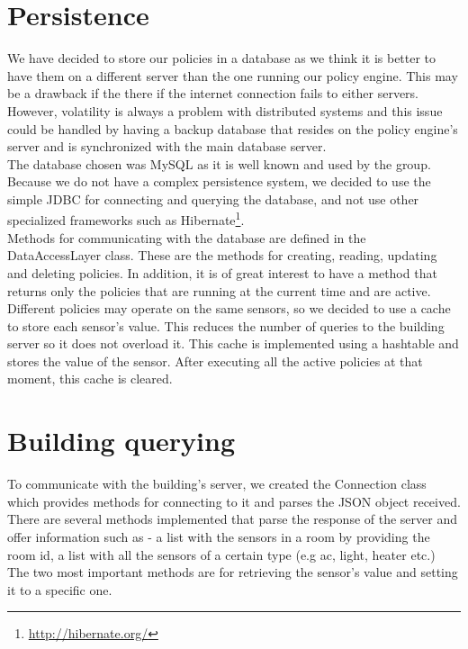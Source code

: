 \section{Persistence}
We have decided to store our policies in a database as we think it is better to have them on a different server than the one running our policy engine. This may be a drawback if the there if the internet connection fails to either servers. However, volatility is always a problem with distributed systems and this issue could be handled by having a backup database that resides on the policy engine's server and is synchronized with the main database server.
\\ The database chosen was MySQL as it is well known and used by the group. Because we do not have a complex persistence system, we decided to use the simple JDBC for connecting and querying the database, and not use other specialized frameworks such as Hibernate\footnote{\url{http://hibernate.org/}}. 
\\Methods for communicating with the database are defined in the DataAccessLayer class. These are the methods for creating, reading, updating and deleting policies. In addition, it is of great interest to have a method that returns only the policies that are running at the current time and are active. 
\\Different policies may operate on the same sensors, so we decided to use a cache to store each sensor's value. This reduces the number of queries to the building server so it does not overload it. This cache is implemented using a hashtable and stores the value of the sensor. After executing all the active policies at that moment, this cache is cleared. 
\section{Building querying}
To communicate with the building's server, we created the Connection class which provides methods for connecting to it and parses the JSON object received. There are several methods implemented that parse the response of the server and offer information such as - a list with the sensors in a room by providing the room id, a list with all the sensors of a certain type (e.g ac, light, heater etc.) The two most important methods are for retrieving the sensor's value and setting it to a specific one. 

